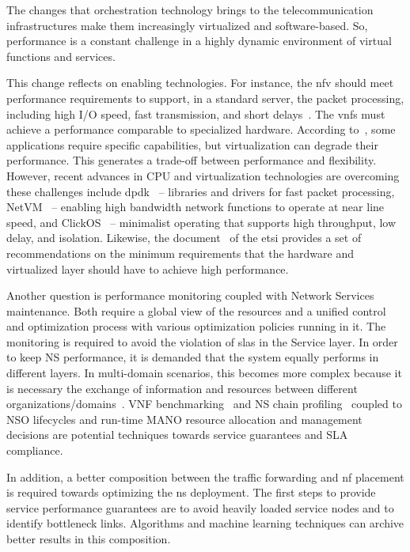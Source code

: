 The changes that orchestration technology brings to the telecommunication infrastructures make them increasingly virtualized and software-based. So, performance is a constant challenge in a highly dynamic environment of virtual functions and services.  

This change reflects on enabling technologies. For instance, the \gls{nfv} should meet performance requirements to support, in a standard server, the packet processing, including high I/O speed, fast transmission, and short delays~\cite{YongLi2015Software-DefinedSurvey}. The \glspl{vnf} must achieve a performance comparable to specialized hardware. According to~\cite{Mijumbi2016NetworkChallenges}, some applications require specific capabilities, but virtualization can degrade their performance. This generates a trade-off between performance and flexibility. However, recent advances in CPU and virtualization technologies are overcoming these challenges include \gls{dpdk}~\cite{LinuxFoundationDPDKKit} -- libraries and drivers for fast packet processing, NetVM~\cite{7036139} -- enabling high bandwidth network functions to operate at near line speed, and ClickOS~\cite{Martins:2014:CAN:2616448.2616491} -- minimalist operating that supports high throughput, low delay, and isolation. Likewise, the document~\cite{ETSIGSPractises} of the \gls{etsi}  provides a set of recommendations on the minimum requirements that the hardware and virtualized layer should have to achieve high performance.

Another question is performance monitoring coupled with Network Services maintenance. Both require a global view of the resources and a unified control and optimization process with various optimization policies running in it. The monitoring is required to avoid the violation of \glspl{sla} in the Service layer. In order to keep NS performance, it is demanded that the system equally performs in different layers. In multi-domain scenarios, this becomes more complex because it is necessary the exchange of information and resources between different organizations/domains~\cite{md2}. 
VNF benchmarking~\cite{7313620} and NS chain profiling~\cite{7956044} coupled to NSO lifecycles and run-time MANO resource allocation and management decisions are potential techniques towards service guarantees and SLA compliance.  

In addition, a better composition between the traffic forwarding and \gls{nf} placement is required towards optimizing the \gls{ns} deployment. The first steps to provide service performance guarantees are to avoid heavily loaded service nodes and to identify bottleneck links. Algorithms and machine learning techniques can archive better results in this composition.   

